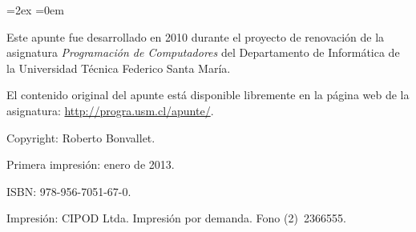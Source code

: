 \thispagestyle{empty}
\begin{minipage}[B]{\textwidth}
  \footnotesize
  \parskip=2ex
  \parindent=0em

  \vspace{100ex}

  Este apunte fue desarrollado en 2010
  durante el proyecto de renovación de la asignatura
  \emph{Programación de Computadores}
  del Departamento de Informática
  de la Universidad Técnica Federico Santa María.

  El contenido original del apunte está disponible libremente
  en la página web de la asignatura:
  \url{http://progra.usm.cl/apunte/}.

  Copyright:  Roberto Bonvallet.

  Primera impresión: enero de 2013.

  ISBN: 978-956-7051-67-0.

  Impresión: CIPOD Ltda. Impresión por demanda. Fono (2)~2366555.
\end{minipage}


